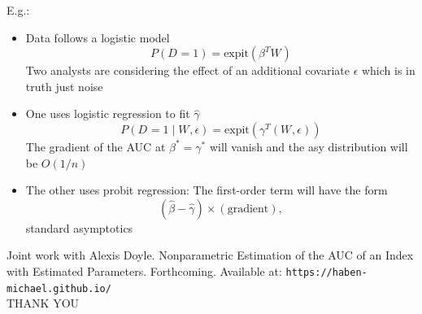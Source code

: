 \documentclass{beamer}
\renewcommand{\P}{P}
\newcommand{\W}[1][]{W_{#1}}
\newcommand{\D}[1][]{D_{#1}}
\renewcommand{\star}[1]{{#1}^\ast}
\begin{document}
\begin{frame}
  E.g.:
  \begin{itemize}
\item Data follows a logistic model
  $$P(\D=1) = \text{expit}(\beta^T \W)$$
  Two analysts are considering the effect of an additional covariate $\epsilon$ which is in truth just noise
\item One uses logistic regression to fit $\hat\gamma$
  $$\P(\D=1 \mid \W,\epsilon) = \text{expit}(\gamma^T (\W,\epsilon))$$
  The gradient of the AUC at $\star\beta=\star\gamma$ will vanish and the asy distribution will be $O(1/n)$
\item The other uses probit regression: The first-order term will have the form $$(\hat\beta-\hat\gamma)\times (\text{gradient}),$$
  standard asymptotics
\end{itemize}
\end{frame}


\begin{frame}
  Joint work with Alexis Doyle. Nonparametric Estimation of the AUC of an Index with
  Estimated Parameters. Forthcoming. Available at: \texttt{https://haben-michael.github.io/}\\
  \vspace{.7in}
  \centering
  \huge THANK YOU
\end{frame}
\end{document}
